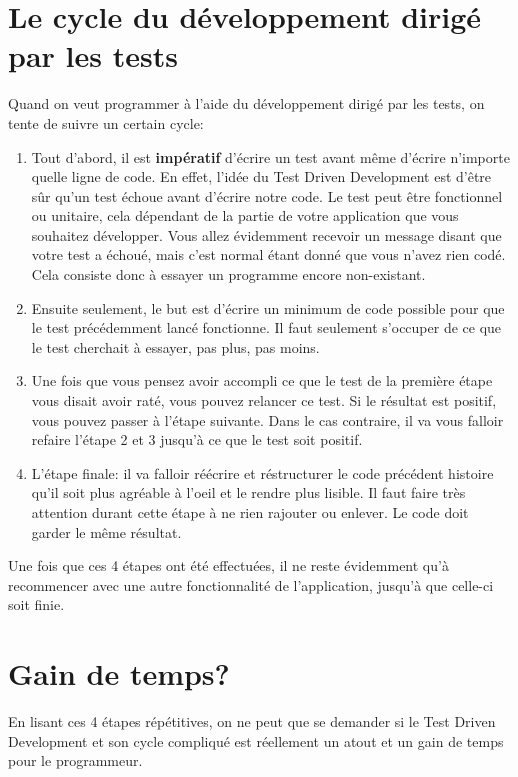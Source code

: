 \documentclass[letterpaper,10pt,french]{sphinxmanual}
\begin{document}
\section{Le cycle du développement dirigé par les tests}
\label{tdd:le-cycle-du-developpement-dirige-par-les-tests}
Quand on veut programmer à l'aide du développement dirigé par les tests, on
tente de suivre un certain cycle:
\begin{enumerate}
\item {} 
Tout d'abord, il est \textbf{impératif} d'écrire un test avant même d'écrire
n'importe quelle ligne de code. En effet, l'idée du Test Driven Development
est d'être sûr qu'un test échoue avant d'écrire notre code. Le test peut
être fonctionnel ou unitaire, cela dépendant de la partie de votre
application que vous souhaitez développer. Vous allez évidemment recevoir
un message disant que votre test a échoué, mais c'est normal étant
donné que vous n'avez rien codé. Cela consiste donc à essayer un
programme encore non-existant.

\item {} 
Ensuite seulement, le but est d'écrire un minimum de code possible
pour que le test précédemment lancé fonctionne. Il faut seulement s'occuper
de ce que le test cherchait à essayer, pas plus, pas moins.

\item {} 
Une fois que vous pensez avoir accompli ce que le test de la première étape
vous disait avoir raté, vous pouvez relancer ce test. Si le résultat
est positif, vous pouvez passer à l'étape suivante. Dans le cas contraire,
il va vous falloir refaire l'étape 2 et 3 jusqu'à ce que le test soit
positif.

\item {} 
L'étape finale: il va falloir réécrire et réstructurer le code précédent
histoire qu'il soit plus agréable à l'oeil et le rendre plus lisible.
Il faut faire très attention durant cette étape à ne rien rajouter ou
enlever. Le code doit garder le même résultat.

\end{enumerate}

Une fois que ces 4 étapes ont été effectuées, il ne reste évidemment qu'à
recommencer avec une autre fonctionnalité de l'application, jusqu'à
que celle-ci soit finie.


\section{Gain de temps?}
\label{tdd:gain-de-temps}
En lisant ces 4 étapes répétitives, on ne peut que se demander si le Test
Driven Development et son cycle compliqué est réellement un atout et un gain
de temps pour le programmeur.
\end{document}
